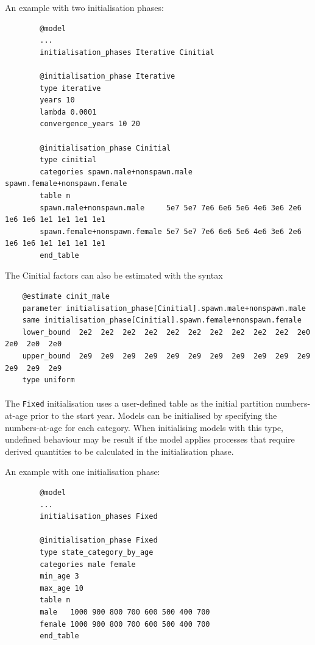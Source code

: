 An example with two initialisation phases:

{\small{\begin{verbatim}
		@model
		...
		initialisation_phases Iterative Cinitial

		@initialisation_phase Iterative
		type iterative
		years 10
		lambda 0.0001
		convergence_years 10 20

		@initialisation_phase Cinitial
		type cinitial
		categories spawn.male+nonspawn.male spawn.female+nonspawn.female
		table n
		spawn.male+nonspawn.male     5e7 5e7 7e6 6e6 5e6 4e6 3e6 2e6 1e6 1e6 1e1 1e1 1e1 1e1
		spawn.female+nonspawn.female 5e7 5e7 7e6 6e6 5e6 4e6 3e6 2e6 1e6 1e6 1e1 1e1 1e1 1e1
		end_table
		\end{verbatim}}}

The Cinitial factors can also be estimated with the syntax

{\small{\begin{verbatim}
	@estimate cinit_male
	parameter initialisation_phase[Cinitial].spawn.male+nonspawn.male
	same initialisation_phase[Cinitial].spawn.female+nonspawn.female
	lower_bound  2e2  2e2  2e2  2e2  2e2  2e2  2e2  2e2  2e2  2e2  2e0  2e0  2e0  2e0
	upper_bound  2e9  2e9  2e9  2e9  2e9  2e9  2e9  2e9  2e9  2e9  2e9  2e9  2e9  2e9
	type uniform
	\end{verbatim}}}

\paragraph{}

The \texttt{Fixed} initialisation uses a user-defined table as the initial partition numbers-at-age prior to the start year. Models can be initialised by specifying the numbers-at-age for each category. When initialising models with this type, undefined behaviour may be result if the model applies processes that require derived quantities to be calculated in the initialisation phase.

An example with one initialisation phase:

{\small{\begin{verbatim}
		@model
		...
		initialisation_phases Fixed

		@initialisation_phase Fixed
		type state_category_by_age
		categories male female
		min_age 3
		max_age 10
		table n
		male   1000 900 800 700 600 500 400 700
		female 1000 900 800 700 600 500 400 700
		end_table
		\end{verbatim}}}

